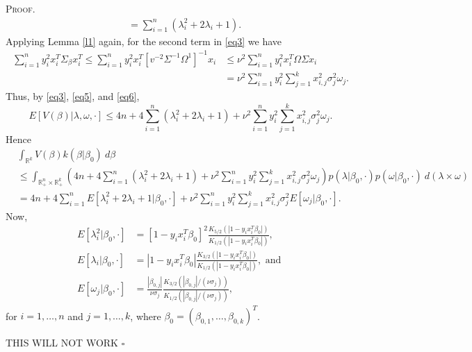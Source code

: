 \documentclass[12pt]{article}
\newcounter{ProofCounter}
\newenvironment{Proof}{\stepcounter{ProofCounter}\textsc{Proof.}}{\hfill$\square$}
\begin{document}
\begin{Proof}
\begin{align}
    & = \sum_{i=1}^{n}(\lambda_i^2 + 2\lambda_i + 1).
    \label{eq5}
  \end{align}
  Applying Lemma \ref{l1} again, for the second term in \eqref{eq3} we have 
  \begin{align}
    \sum_{i=1}^{n}y_i^2 x_i^T\Sigma_{\beta} x_i^T \leq \sum_{i=1}^{n}y_i^2 x_i^T[v^{-2}\Sigma^{-1}\Omega^{1}]^{-1}x_i & \leq \nu^2\sum_{i=1}^{n} y_i^2
    x_i^T \Omega \Sigma x_i \nonumber \\
    & = \nu^2 \sum_{i=1}^{n}y_i^2 \sum_{j=1}^{k}x_{i,j}^2 \sigma_{j}^2 \omega_j.
    \label{eq6}
  \end{align}
  Thus, by \eqref{eq3}, \eqref{eq5}, and \eqref{eq6}, 
  \[
    E[V(\beta)|\lambda, \omega, \cdot] \leq 4n + 4\sum_{i=1}^{n}(\lambda_i^2 + 2\lambda_i + 1) + \nu^2 \sum_{i=1}^{n}y_i^2 \sum_{j=1}^{k}x_{i,j}^2
    \sigma_j^2 \omega_j.
  \]
  Hence 
  \begin{align}
    & \int_{\mathbb{R}^{k}} V(\beta) k(\beta|\beta_0)\ d\beta \nonumber \\
    & \leq \int_{\mathbb{R}^{n}_+ \times \mathbb{R}^{k}_+}
    \left(4n + 4\sum_{i=1}^{n}(\lambda_i^2 + 2\lambda_i + 1) + \nu^2 \sum_{i=1}^{n}y_i^2 \sum_{j=1}^{k}x_{i,j}^2 \sigma_j^2 \omega_j \right)
    p(\lambda|\beta_0, \cdot) p(\omega|\beta_0,\cdot)\ d(\lambda \times \omega) \nonumber \\
    & = 4n + 4\sum_{i=1}^{n}E[\lambda_i^2 + 2\lambda_i + 1|\beta_0, \cdot] + \nu^2\sum_{i=1}^{n}y_i^2\sum_{j=1}^{k}x_{i,j}^2\sigma_j^2
    E[\omega_j|\beta_0,\cdot].
    \label{eq7}
  \end{align}
  Now,
  \begin{align*}
    E[\lambda_i^2|\beta_0, \cdot] & = [1 - y_ix_i^T\beta_0]^2 \frac{K_{5/2}\left( |1 - y_ix_i^T\beta_0| \right)}{K_{1/2}\left( |1 - y_ix_i^T\beta_0|
    \right)}, \\
    E[\lambda_i|\beta_0, \cdot] & = |1 - y_ix_i^T\beta_0| \frac{K_{3/2}\left( |1 - y_ix_i^T\beta_0| \right)}{K_{1/2}\left( |1 - y_ix_i^T\beta_0|
    \right)}, \text{ and } \\
    E[\omega_j|\beta_0, \cdot] & = \frac{|\beta_{0,j}|}{\nu\sigma_j} \frac{K_{3/2}\left( |\beta_{0,j}| / (\nu\sigma_j) \right)}{ 
    K_{1/2}\left( |\beta_{0,j}| / (\nu \sigma_{j}) \right)},
  \end{align*}
  for $i = 1,\dots, n$ and $j = 1,\dots,k$, where $\beta_0 = (\beta_{0,1}, \dots, \beta_{0,k})^T$.

  {\Large THIS WILL NOT WORK}
\end{Proof}
\end{document}
